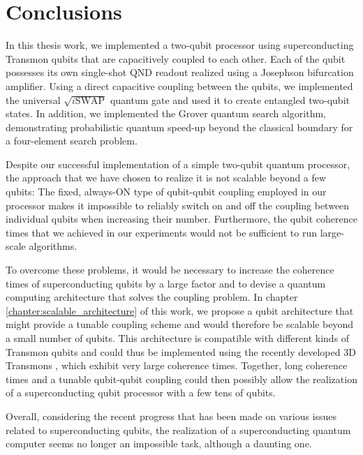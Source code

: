 \chapter{Conclusions} \label{chapter:conclusions}

In this thesis work, we implemented a two-qubit processor using superconducting Transmon qubits that are capacitively coupled to each other. Each of the qubit possesses its own single-shot QND readout realized using a Josephson bifurcation amplifier. Using a direct capacitive coupling between the qubits, we implemented the universal $\sqrt{i\mathrm{SWAP}}$ quantum gate and used it to create entangled two-qubit states. In addition, we implemented the Grover quantum search algorithm, demonstrating probabilistic quantum speed-up beyond the classical boundary for a four-element search problem.

\smallskip

Despite our successful implementation of a simple two-qubit quantum processor, the approach that we have chosen to realize it is not scalable beyond a few qubits: The fixed, always-ON type of qubit-qubit coupling employed in our processor makes it impossible to reliably switch on and off the coupling between individual qubits when increasing their number. Furthermore, the qubit coherence times that we achieved in our experiments would not be sufficient to run large-scale algorithms.

\smallskip

To overcome these problems, it would be necessary to increase the coherence times of superconducting qubits by a large factor and to devise a quantum computing architecture that solves the coupling problem. In chapter \ref{chapter:scalable_architecture} of this work, we propose a qubit architecture that might provide a tunable coupling scheme and would therefore be scalable beyond a small number of qubits. This architecture is compatible with different kinds of Transmon qubits and could thus be implemented using the recently developed 3D Transmons \citep{paik_observation_2011}, which exhibit very large coherence times. Together, long coherence times and a tunable qubit-qubit coupling could then possibly allow the realization of a superconducting qubit processor with a few tens of qubits. 

\smallskip

Overall, considering the recent progress that has been made on various issues related to superconducting qubits, the realization of a superconducting quantum computer seems no longer an impossible task, although a daunting one.